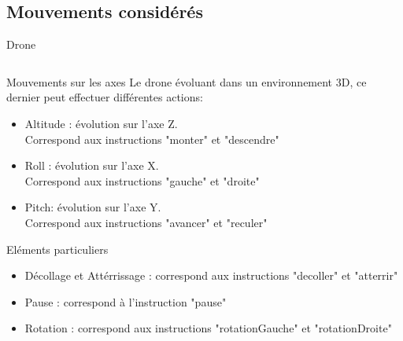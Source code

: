 \documentclass{bredelebeamer}
\begin{document}
\subsection{Mouvements considérés}

\begin{frame}{Drone}

\begin{columns}

\begin{column}{0.65\textwidth}

\begin{block}{Mouvements sur les axes}
Le drone évoluant dans un environnement 3D, ce dernier peut effectuer différentes actions: \\
\begin{itemize}
\item Altitude : évolution sur l'axe Z. \\Correspond aux instructions "\alert{monter}" et "\alert{descendre}"
\item Roll : évolution sur l'axe X. \\Correspond aux instructions "\alert{gauche}" et "\alert{droite}"
\item Pitch: évolution sur l'axe Y. \\Correspond aux instructions "\alert{avancer}" et "\alert{reculer}"
\end{itemize}
\end{block}\pause

\begin{exampleblock}{Eléments particuliers}
\begin{itemize}
\item Décollage et Attérrissage : correspond aux instructions "\alert{decoller}" et "\alert{atterrir}"
\item Pause : correspond à  l'instruction "\alert{pause}"
\item Rotation : correspond aux instructions "\alert{rotationGauche}" et "\alert{rotationDroite}"
\end{itemize}
\end{exampleblock}\pause


\end{column}
\end{columns}
\end{frame}
\end{document}
